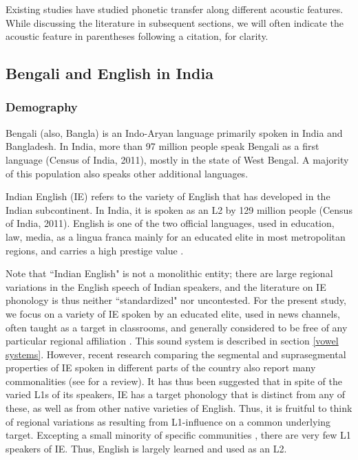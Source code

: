 \documentclass[12 pt]{article}
\begin{document}
Existing studies have studied phonetic transfer along different acoustic features. While discussing the literature in subsequent sections, we will often indicate the acoustic feature in parentheses following a citation, for clarity. 

\subsection{Bengali and English in India} \label{bengali_english_in_india}

\subsubsection*{Demography} 

Bengali (also, Bangla) is an Indo-Aryan language primarily spoken in India and Bangladesh. In India, more than 97 million people speak Bengali as a first language (Census of India, 2011), mostly in the state of West Bengal. A majority of this population also speaks other additional languages.

Indian English (IE) refers to the variety of English that has developed in the Indian subcontinent. In India, it is spoken as an L2 by 129 million people (Census of India, 2011).  English is one of the two official languages, used in education, law, media, as a lingua franca mainly for an educated elite in most metropolitan regions, and carries a high prestige value \citep{pandey201517, kachru1981english, tollefson2014language, kachru1983indianization}.

Note that ``Indian English" is not a monolithic entity; there are large regional variations in the English speech of Indian speakers, and the literature on IE phonology is thus neither ``standardized" nor uncontested. For the present study, we focus on a variety of IE spoken by an educated elite, used in news channels, often taught as a target in classrooms, and generally considered to be free of any particular regional affiliation \citep[c.f.][who reports this variety to be ``a \textit{de-facto} norm", and thus calls it General(ized) Indian English]{masica1972sound}. This sound system is described in section \ref{vowel systems}. However, recent research comparing the segmental and suprasegmental properties of IE spoken in different parts of the country also report many commonalities (see \cite{sirsa2013effects} for a review). It has thus been suggested that in spite of the varied L1s of its speakers, IE has a target phonology that is distinct from any of these, as well as from other native varieties of English. Thus, it is fruitful to think of regional variations as resulting from L1-influence on a common underlying target. Excepting a small minority of specific communities \citep{pandey201517, wells1982accents, coelho1997anglo}, there are very few L1 speakers of IE. Thus, English is largely learned and used as an L2.
\end{document}
